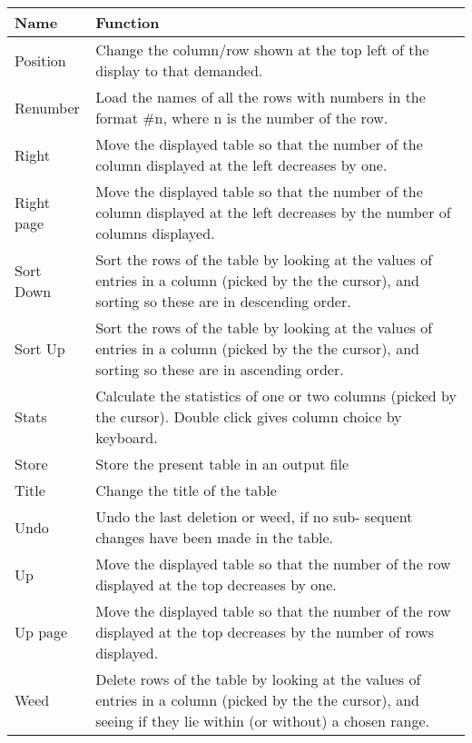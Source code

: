 \begin{small}
{{\begin{tabular}{|l|p{4.5in}|}\hline
 Name      &    Function \\ \hline
 Position    &  Change the column/row shown at the top left
                of the display to that demanded. \\
 Renumber    &  Load the names of all the rows with numbers
                in the format \#n, where n is the number of
                the row. \\
 Right       &  Move the displayed table so that the number
                of the column displayed at the left decreases
                by one. \\
 Right page  &  Move the displayed table so that the number
                of the column displayed at the left decreases
                by the number of columns displayed. \\
 Sort Down   &  Sort the rows of the table by looking at the
                values of entries in a column (picked by the
                the cursor), and sorting so these are in
                descending order. \\
 Sort Up     &  Sort the rows of the table by looking at the
                values of entries in a column (picked by the
                the cursor), and sorting so these are in
                ascending order. \\
 Stats       &  Calculate the statistics of one or two columns
                (picked by the cursor). Double click gives
                column choice by keyboard. \\
 Store       &  Store the present table in an output file \\
 Title       &  Change the title of the table \\
 Undo        &  Undo the last deletion or weed, if no sub-
                sequent changes have been made in the table. \\
 Up          &  Move the displayed table so that the number
                of the row displayed at the top decreases
                by one. \\
 Up page     &  Move the displayed table so that the number
                of the row displayed at the top decreases
                by the number of rows displayed.  \\
 Weed        &  Delete rows of the table by looking at the
                values of entries in a column (picked by the
                the cursor), and seeing if they lie within
                (or without) a chosen range. \\ \hline
\end{tabular}

}}
\end{small}

